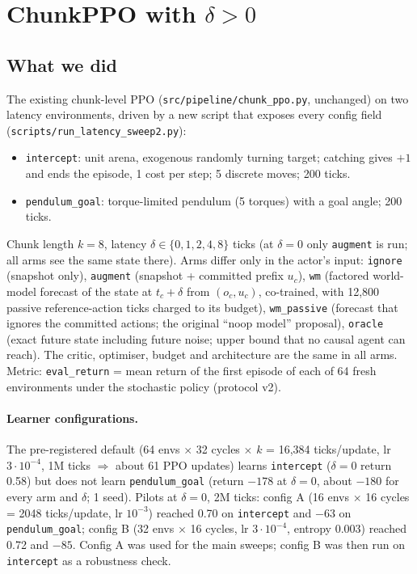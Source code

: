 \documentclass[11pt]{article}
\newcommand{\srcpath}[1]{\texttt{\small #1}}
\begin{document}
\section{ChunkPPO with $\delta>0$}

\subsection{What we did}
The existing chunk-level PPO (\srcpath{src/pipeline/chunk\_ppo.py}, unchanged) on two latency environments, driven by a new script that exposes every config field (\srcpath{scripts/run\_latency\_sweep2.py}):
\begin{itemize}
\item \texttt{intercept}: unit arena, exogenous randomly turning target; catching gives $+1$ and ends the episode, 1 cost per step; 5 discrete moves; 200 ticks.
\item \texttt{pendulum\_goal}: torque-limited pendulum (5 torques) with a goal angle; 200 ticks.
\end{itemize}
Chunk length $k=8$, latency $\delta\in\{0,1,2,4,8\}$ ticks (at $\delta=0$ only \texttt{augment} is run; all arms see the same state there). Arms differ only in the actor's input: \texttt{ignore} (snapshot only), \texttt{augment} (snapshot + committed prefix $u_c$), \texttt{wm} (factored world-model forecast of the state at $t_c+\delta$ from $(o_c,u_c)$, co-trained, with 12{,}800 passive reference-action ticks charged to its budget), \texttt{wm\_passive} (forecast that ignores the committed actions; the original ``noop model'' proposal), \texttt{oracle} (exact future state including future noise; upper bound that no causal agent can reach). The critic, optimiser, budget and architecture are the same in all arms. Metric: \texttt{eval\_return} = mean return of the first episode of each of 64 fresh environments under the stochastic policy (protocol v2).

\paragraph{Learner configurations.} The pre-registered default (64 envs $\times$ 32 cycles $\times$ $k$ = 16{,}384 ticks/update, lr $3\cdot10^{-4}$, 1M ticks $\Rightarrow$ about 61 PPO updates) learns \texttt{intercept} ($\delta=0$ return 0.58) but does not learn \texttt{pendulum\_goal} (return $-178$ at $\delta=0$, about $-180$ for every arm and $\delta$; 1 seed). Pilots at $\delta=0$, 2M ticks: config A (16 envs $\times$ 16 cycles = 2048 ticks/update, lr $10^{-3}$) reached 0.70 on \texttt{intercept} and $-63$ on \texttt{pendulum\_goal}; config B (32 envs $\times$ 16 cycles, lr $3\cdot10^{-4}$, entropy 0.003) reached 0.72 and $-85$. Config A was used for the main sweeps; config B was then run on \texttt{intercept} as a robustness check.
\end{document}

